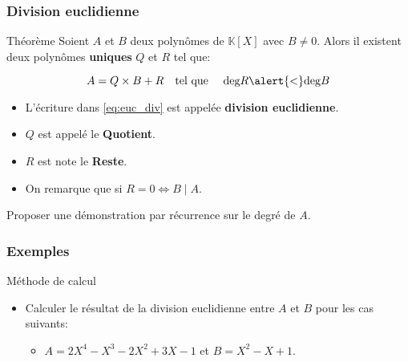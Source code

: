 \documentclass{beamer}
\newcommand{\setK}{\mathbb{K}}
\begin{document}
\begin{frame}[t]
  \frametitle{Division euclidienne}
 \begin{block}{Théorème}
   \small
   Soient $A$ et $B$ deux polynômes de $\setK[X]$ avec $B\neq 0$. Alors il
   existent deux polynômes \textbf{\alert{uniques}} $Q$ et $R$ tel que:

   \begin{equation}
     \label{eq:euc_div}
     A = Q\times B + R\quad \text{tel que }\quad \text{deg} R \alert{\mathbf{<}}
     \text{deg} B
   \end{equation}
 \end{block} 

 \begin{itemize}
   \small
   \item L'écriture dans \eqref{eq:euc_div} est appelée \textbf{\alert{division
     euclidienne}}.\\[4pt]
   \item $Q$ est appelé le \textbf{\alert{Quotient}}.\\[4pt]
   \item $R$ est note le \textbf{\alert{Reste}}. \\[4pt]
    \item On remarque que si $R=0   \iff B\;|\; A$.
 \end{itemize}

 \vspace*{1cm}
 Proposer une démonstration par récurrence sur le degré de $A$.
\end{frame}

\begin{frame}[t]
  \frametitle{Exemples}
  \begin{block}{Méthode de calcul}
    \begin{itemize}
      \item  Calculer le résultat de la division euclidienne entre $A$ et $B$
        pour les cas suivants:\\[8pt]

        \begin{itemize}
          \item $A= 2X^4 - X^3 -2X^2 +3X -1$ et $B=X^2 - X  + 1$.\\[4pt]
        \end{itemize}
    \end{itemize} 
  \end{block}
  \pause
  \begin{center}
\end{center}
\end{frame}
\end{document}
